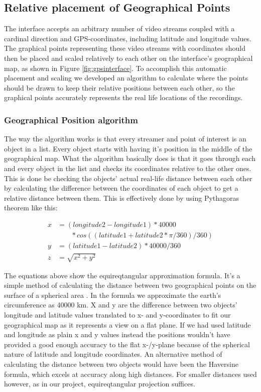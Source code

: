 \documentclass[9pt,a4paper]{acmproc}
\begin{document}
\subsection{Relative placement of Geographical Points}
The interface accepts an arbitrary number of video streams coupled with a cardinal direction and GPS-coordinates, including latitude and longitude values. The graphical points representing these video streams with coordinates should then be placed and scaled relatively to each other on the interface's geographical map, as shown in Figure \ref{fig:gpsinterface}. To accomplish this automatic placement and scaling we developed an algorithm to calculate where the points should be drawn to keep their relative positions between each other, so the graphical points accurately represents the real life locations of the recordings.

\subsubsection{Geographical Position algorithm}
The way the algorithm works is that every streamer and point of interest is an object in a list. Every object starts with having it's position in the middle of the geographical map. What the algorithm basically does is that it goes through each and every object in the list and checks its coordinates relative to the other ones. This is done be checking the objects' actual real-life distance between each other by calculating the difference between the coordinates of each object to get a relative distance between them. This is effectively done by using Pythagoras theorem like this:

\begin{align*}
x &= (longitude2-longitude1)*40000  \\
 &\phantom{b=\,} *cos((latitude1+latitude2 * \pi/360)/360) \nonumber \\
y &= (latitude1-latitude2)*40000/360 \\
z &= \sqrt{x^2+y^2}
\end{align*}

The equations above show the equireqtangular approximation formula. It's a simple method of calculating the distance between two geographical points on the surface of a spherical area \cite[s.~5]{equi}. In the formula we approximate the earth's circumference as 40000 km. X and y are the difference between two objects' longitude and latitude values translated to x- and y-coordinates to fit our geographical map as it represents a view on a flat plane. If we had used latitude and longitude as plain x and y values instead the positions wouldn't have provided a good enough accuracy to the flat x-/y-plane because of the spherical nature of latitude and longitude coordinates. An alternative method of calculating the distance between two objects would have been the Haversine formula, which excels at accuracy along high distances. For smaller distances used however, as in our project, equireqtangular projection suffices.
\end{document}
